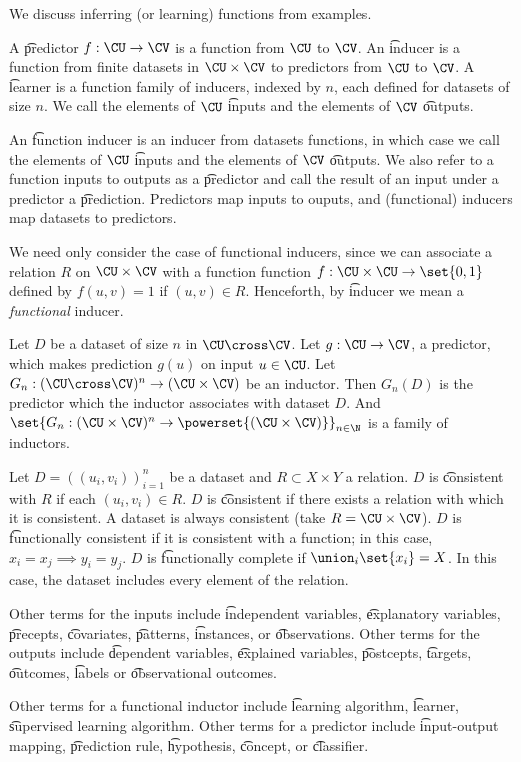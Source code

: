 
We discuss inferring (or learning) functions from examples.

A \t{predictor} $f: \CU \to \CV$ is a function from $\CU$ to $\CV$.
An \t{inducer} is a function from finite datasets in $\CU \times \CV$ to predictors from $\CU$ to $\CV$.
A \t{learner} is a function family of inducers, indexed by $n$, each defined for datasets of size $n$.
We call the elements of $\CU$ \t{inputs} and the elements of $\CV$ \t{outputs}.

An \t{function inducer} is an inducer from datasets functions, in which case we call the elements of $\CU$ \t{inputs} and the elements of $\CV$ \t{outputs}.
We also refer to a function inputs to outputs as a \t{predictor} and call the result of an input under a predictor a \t{prediction}.
Predictors map inputs to ouputs, and (functional) inducers map datasets to predictors.

We need only consider the case of functional inducers, since we can associate a relation $R$ on $\CU \times \CV$ with a function function $f: \CU \times \CU \to \set{0, 1}$ defined by $f(u, v) = 1$ if $(u, v) \in R$.
Henceforth, by \t{inducer} we mean a \textit{functional} inducer.


Let $D$ be a dataset of size $n$ in $\CU \cross \CV$.
Let $g: \CU \to \CV$, a predictor, which makes prediction $g(u)$ on input $u \in \CU$.
Let $G_n: (\CU \cross \CV)^n \to (\CU \times \CV)$ be an inductor.
Then $G_n(D)$ is the predictor which the inductor associates with dataset $D$.
And $\set{G_n: (\CU \times \CV)^n \to \powerset{(\CU \times \CV)}}_{n \in \N}$ is a family of inductors.


Let $D = ((u_i, v_i))_{i = 1}^{n}$ be a dataset and $R \subset X \times Y$ a relation.
$D$ is \t{consistent with $R$} if each $(u_i, v_i) \in R$.
$D$ is \t{consistent} if there exists a relation with which it is consistent.
A dataset is always consistent (take $R = \CU \times \CV$).
$D$ is \t{functionally consistent} if it is consistent with a function; in this case, $x_i = x_j \implies y_i = y_j$.
$D$ is \t{functionally complete} if $\union_i\set{x_i} = X$.
In this case, the dataset includes every element of the relation.


Other terms for the inputs include \t{independent variables}, \t{explanatory variables}, \t{precepts}, \t{covariates}, \t{patterns}, \t{instances}, or \t{observations}.
Other terms for the outputs include \t{dependent variables}, \t{explained variables}, \t{postcepts}, \t{targets}, \t{outcomes}, \t{labels} or \t{observational outcomes}.

Other terms for a functional inductor include \t{learning algorithm}, \t{learner}, \t{supervised learning algorithm}.
Other terms for a predictor include \t{input-output} mapping, \t{prediction rule}, \t{hypothesis}, \t{concept}, or \t{classifier}.
